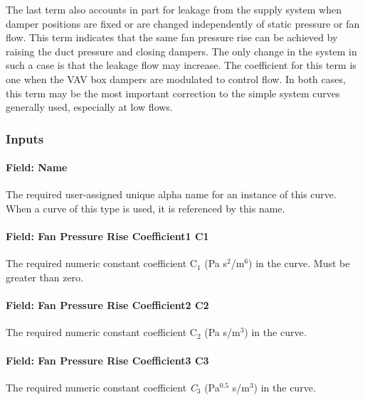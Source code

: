 The last term also accounts in part for leakage from the supply system when damper positions are fixed or are changed independently of static pressure or fan flow. This term indicates that the same fan pressure rise can be achieved by raising the duct pressure and closing dampers. The only change in the system in such a case is that the leakage flow may increase. The coefficient for this term is one when the VAV box dampers are modulated to control flow. In both cases, this term may be the most important correction to the simple system curves generally used, especially at low flows.

\subsubsection{Inputs}\label{inputs-12-010}

\paragraph{Field: Name}\label{field-name-12-007}

The required user-assigned unique alpha name for an instance of this curve. When a curve of this type is used, it is referenced by this name.

\paragraph{Field: Fan Pressure Rise Coefficient1 C1}\label{field-fan-pressure-rise-coefficient1-c1}

The required numeric constant coefficient C\emph{\(_{1}\)} (Pa s\(^{2}\)/m\(^{6}\)) in the curve. Must be greater than zero.

\paragraph{Field: Fan Pressure Rise Coefficient2 C2}\label{field-fan-pressure-rise-coefficient2-c2}

The required numeric constant coefficient C\emph{\(_{2}\)} (Pa s/m\(^{3}\)) in the curve\emph{.}

\paragraph{Field: Fan Pressure Rise Coefficient3 C3}\label{field-fan-pressure-rise-coefficient3-c3}

The required numeric constant coefficient \emph{C\(_{3}\)} (Pa\(^{0.5}\) s/m\(^{3}\)) in the curve\emph{.}

